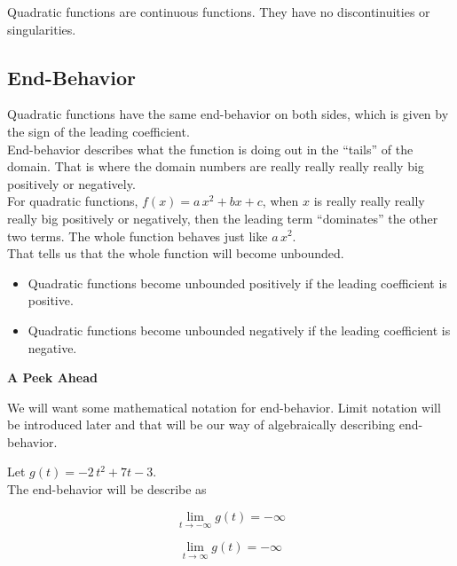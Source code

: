 \documentclass{ximera}
\begin{document}
Quadratic functions are continuous functions.  They have no discontinuities or singularities. \\












\subsection*{End-Behavior}

Quadratic functions have the same end-behavior on both sides, which is given by the sign of the leading coefficient. \\


End-behavior describes what the function is doing out in the ``tails'' of the domain.  That is where the domain numbers are really really really really big positively or negatively. \\

For quadratic functions, $f(x) = a \, x^2 + b x + c$, when $x$ is really really really really big positively or negatively, then the leading term ``dominates'' the other two terms.  The whole function behaves just like $a \, x^2$. \\

That tells us that the whole function will become unbounded. \\


\begin{itemize}
     \item Quadratic functions become unbounded positively if the leading coefficient is positive.
     \item Quadratic functions become unbounded negatively if the leading coefficient is negative.
\end{itemize}



\begin{idea} \textbf{\textcolor{red!80!black}{A Peek Ahead}}

We will want some mathematical notation for end-behavior.  Limit notation will be introduced later and that will be our way of algebraically describing end-behavior. \\

\end{idea}


\begin{example}

Let $g(t) = -2 \, t^2 + 7t - 3$. \\


The end-behavior will be describe as 

\[
\lim\limits_{t \to -\infty} g(t) = -\infty
\]


\[
\lim\limits_{t \to \infty} g(t) = -\infty
\]

\end{example}
\end{document}
